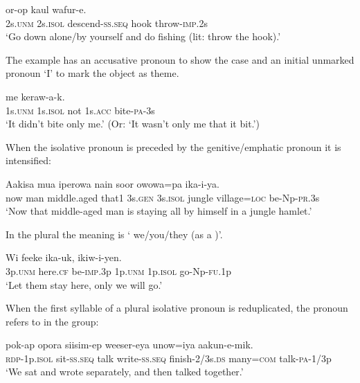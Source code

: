 \ea%
\label{ex:3:x600}
\gll {}  or-op kaul wafur-e. \\
2s.\textsc{unm} 2s.\textsc{isol} descend-\textsc{ss}.\textsc{seq} hook throw-\textsc{imp}.2s\\
\glt`Go down alone/by yourself and do fishing (lit: throw the hook).'
\z

The example  has an accusative pronoun to show the case and an initial unmarked pronoun  `I' to mark the object as theme.

\ea%
\label{ex:3:x601}
\gll {}  me  keraw-a-k. \\
1s.\textsc{unm} 1s.\textsc{isol} not 1s.\textsc{acc} bite-\textsc{pa}-3s\\
\glt`It didn't bite only me.' (Or: `It wasn't only me that it bit.')
\z

When the isolative pronoun is preceded by the genitive/emphatic pronoun it is intensified:

\ea%
\label{ex:3:x1813}
\gll Aakisa mua iperowa nain   soor owowa=pa ika-i-ya.\\
now man middle.aged that1 3s.\textsc{gen} 3s.\textsc{isol} jungle village=\textsc{loc} be-Np-\textsc{pr}.3s\\
\glt`Now that middle-aged man is staying all by himself in a jungle hamlet.'
\z

In the plural the meaning is ` we/you/they (as a )'. 

\ea%
\label{ex:3:x602}
\gll Wi feeke ika-uk,   ikiw-i-yen. \\
3p.\textsc{unm} here.\textsc{cf} be-\textsc{imp}.3p 1p.\textsc{unm} 1p.\textsc{isol} go-Np-\textsc{fu}.1p\\
\glt`Let them stay here, only we will go.'
\z

When the first syllable of a plural isolative pronoun is reduplicated, the pronoun refers to  in the group:

\ea%
\label{ex:3:x603}
\gll {} pok-ap opora siisim-ep weeser-eya unow=iya aakun-e-mik.\\
\textsc{rdp}-1p.\textsc{isol} sit-\textsc{ss}.\textsc{seq} talk write-\textsc{ss}.\textsc{seq} finish-2/3s.\textsc{ds} many=\textsc{com} talk-\textsc{pa}-1/3p\\
\glt`We sat and wrote separately, and then talked together.'
\z

